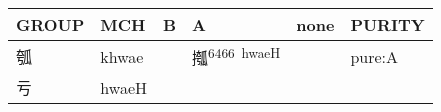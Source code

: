 \documentclass[14pt,a4paper]{scrartcl}
\begin{document}
\begin{longtable}[c]{@{}llllll@{}}
\toprule
\begin{minipage}[b]{0.14\columnwidth}\raggedright\strut
GROUP
\strut\end{minipage} &
\begin{minipage}[b]{0.14\columnwidth}\raggedright\strut
MCH
\strut\end{minipage} &
\begin{minipage}[b]{0.14\columnwidth}\raggedright\strut
B
\strut\end{minipage} &
\begin{minipage}[b]{0.14\columnwidth}\raggedright\strut
A
\strut\end{minipage} &
\begin{minipage}[b]{0.14\columnwidth}\raggedright\strut
none
\strut\end{minipage} &
\begin{minipage}[b]{0.14\columnwidth}\raggedright\strut
PURITY
\strut\end{minipage}\tabularnewline
\midrule
\endhead
\begin{minipage}[t]{0.14\columnwidth}\raggedright\strut
瓠
\strut\end{minipage} &
\begin{minipage}[t]{0.14\columnwidth}\raggedright\strut
khwae
\strut\end{minipage} &
\begin{minipage}[t]{0.14\columnwidth}\raggedright\strut
\strut\end{minipage} &
\begin{minipage}[t]{0.14\columnwidth}\raggedright\strut
摦\textsuperscript{6466~hwaeH}
\strut\end{minipage} &
\begin{minipage}[t]{0.14\columnwidth}\raggedright\strut
\strut\end{minipage} &
\begin{minipage}[t]{0.14\columnwidth}\raggedright\strut
pure:A
\strut\end{minipage}\tabularnewline
\begin{minipage}[t]{0.14\columnwidth}\raggedright\strut
亏
\strut\end{minipage} &
\begin{minipage}[t]{0.14\columnwidth}\raggedright\strut
hwaeH
\strut\end{minipage} &
\begin{minipage}[t]{0.14\columnwidth}\raggedright\strut
\strut\end{minipage} &
\begin{minipage}[t]{0.14\columnwidth}\raggedright\strut

\end{minipage}
\end{longtable}
\end{document}
